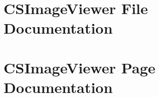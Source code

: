 \documentclass[a4paper]{book}
\begin{document}
\chapter{CSImage\-Viewer File Documentation}








\chapter{CSImage\-Viewer Page Documentation}

\printindex
\end{document}
